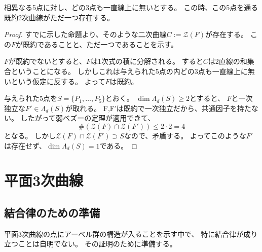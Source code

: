 \documentclass[a4paper]{jsarticle}
\begin{document}
    \begin{Prop}
        相異なる5点に対し、どの3点も一直線上に無いとする。
        この時、この5点を通る既約2次曲線がただ一つ存在する。
    \end{Prop}
    \begin{proof}
        すでに示した命題より、そのような二次曲線$C:=\mathcal{Z}(F)$が存在する。
        この$F$が既約であることと、ただ一つであることを示す。

        $F$が既約でないとすると、$F$は1次式の積に分解される。
        すると$C$は2直線の和集合ということになる。
        しかしこれは与えられた5点の内どの3点も一直線上に無いという仮定に反する。
        よって$F$は既約。

        与えられた5点を$S=\{P_1, \dots, P_5\}$とおく。
        $\dim \Lambda_d (S) \geq 2$とすると、
        $F$と一次独立な$F' \in \Lambda_d (S)$が取れる。
        F,F'は既約で一次独立だから、共通因子を持たない。
        したがって弱ベズーの定理が適用できて、
        \[ \# (\mathcal{Z}(F) \cap \mathcal{Z}(F')) \leq 2 \cdot 2=4 \]
        となる。
        しかし$\mathcal{Z}(F) \cap \mathcal{Z}(F') \supset S$なので、矛盾する。
        よってこのような$F'$は存在せず、$\dim \Lambda_d (S) =1$である。
        
    \end{proof}

\section{平面3次曲線}
    \subsection{結合律のための準備}
        平面3次曲線の点にアーベル群の構造が入ることを示す中で、
        特に結合律が成り立つことは自明でない。
        その証明のために準備する。
\end{document}
